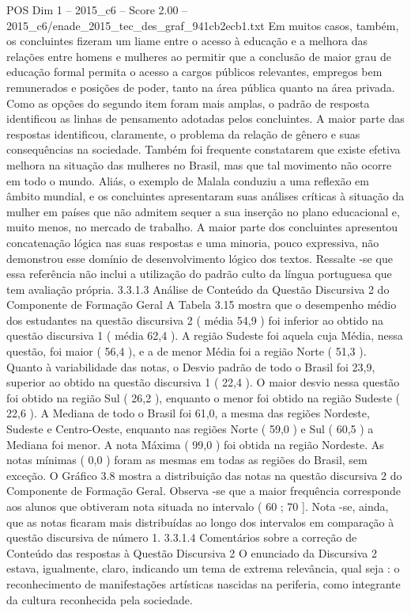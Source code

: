 \begin{textsample}{POS Dim 1 – 2015\_c6 – Score 2.00 – 2015\_c6/enade\_2015\_tec\_des\_graf\_941cb2ecb1.txt}
Em muitos casos, também, os concluintes fizeram um liame entre o acesso à educação e a melhora das relações entre homens e mulheres ao permitir que a conclusão de maior grau de educação formal permita o acesso a cargos públicos relevantes, empregos bem remunerados e posições de poder, tanto na área pública quanto na área privada.
Como as opções do segundo item foram mais amplas, o padrão de resposta identificou as linhas de pensamento adotadas pelos concluintes.
A maior parte das respostas identificou, claramente, o problema da relação de gênero e suas consequências na sociedade.
Também foi frequente constatarem que existe efetiva melhora na situação das mulheres no Brasil, mas que tal movimento não ocorre em todo o mundo.
Aliás, o exemplo de Malala conduziu a uma reflexão em âmbito mundial, e os concluintes apresentaram suas análises críticas à situação da mulher em países que não admitem sequer a sua inserção no plano educacional e, muito menos, no mercado de trabalho.
A maior parte dos concluintes apresentou concatenação lógica nas suas respostas e uma minoria, pouco expressiva, não demonstrou esse domínio de desenvolvimento lógico dos textos.
Ressalte -se que essa referência não inclui a utilização do padrão culto da língua portuguesa que tem avaliação própria. 3.3.1.3 Análise de Conteúdo da Questão Discursiva 2 do Componente de Formação Geral A Tabela 3.15 mostra que o desempenho médio dos estudantes na questão discursiva 2 ( média 54,9 ) foi inferior ao obtido na questão discursiva 1 ( média 62,4 ).
A região Sudeste foi aquela cuja Média, nessa questão, foi maior ( 56,4 ), e a de menor Média foi a região Norte ( 51,3 ).
Quanto à variabilidade das notas, o Desvio padrão de todo o Brasil foi 23,9, superior ao obtido na questão discursiva 1 ( 22,4 ).
O maior desvio nessa questão foi obtido na região Sul ( 26,2 ), enquanto o menor foi obtido na região Sudeste ( 22,6 ).
A Mediana de todo o Brasil foi 61,0, a mesma das regiões Nordeste, Sudeste e Centro-Oeste, enquanto nas regiões Norte ( 59,0 ) e Sul ( 60,5 ) a Mediana foi menor.
A nota Máxima ( 99,0 ) foi obtida na região Nordeste.
As notas mínimas ( 0,0 ) foram as mesmas em todas as regiões do Brasil, sem exceção.
O Gráfico 3.8 mostra a distribuição das notas na questão discursiva 2 do Componente de Formação Geral.
Observa -se que a maior frequência corresponde aos alunos que obtiveram nota situada no intervalo ( 60 ; 70 ].
Nota -se, ainda, que as notas ficaram mais distribuídas ao longo dos intervalos em comparação à questão discursiva de número 1. 3.3.1.4 Comentários sobre a correção de Conteúdo das respostas à Questão Discursiva 2 O enunciado da Discursiva 2 estava, igualmente, claro, indicando um tema de extrema relevância, qual seja : o reconhecimento de manifestações artísticas nascidas na periferia, como integrante da cultura reconhecida pela sociedade.

\end{textsample}
